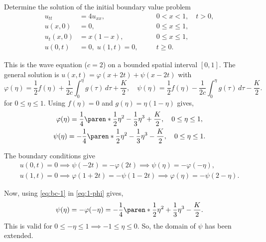 \documentclass[11pt]{penrose}
\begin{document}
\clearpage
\begin{problem}{6}
    Determine the solution of the initial boundary value problem
    \begin{equation*}
        \begin{aligned}
            u_{tt} &= 4u_{xx}, & &0 < x < 1, \quad t > 0,\\
            u(x,0) &= 0, & &0 \leq x \leq 1,\\
            u_t(x,0) &= x(1-x), & &0 \leq x \leq 1,\\
            u(0,t) &= 0, \; u(1,t) = 0, & \quad &t \geq 0.
        \end{aligned}
    \end{equation*}
    
    \solution This is the wave equation ($c = 2$) on a bounded spatial interval $[0,1]$. The general solution is $u(x, t) = \varphi(x + 2t) + \psi(x - 2t)$ with
    \begin{equation*}
        \varphi(\eta) = \frac{1}{2} f(\eta) + \frac{1}{2c} \int_0^\eta g(\tau) \,d\tau + \frac{K}{2},
        \quad
        \psi(\eta) = \frac{1}{2} f(\eta) - \frac{1}{2c} \int_0^\eta g(\tau) \,d\tau - \frac{K}{2}.
    \end{equation*}
    for $0 \leq \eta \leq 1$. Using $f(\eta) = 0$ and $g(\eta) = \eta (1 - \eta)$ gives,
    \begin{gather}
        \varphi(\eta) = \frac{1}{4} \paren*{\frac{1}{2}\eta^2 - \frac{1}{3}\eta^3} + \frac{K}{2}, \quad 0 \leq \eta \leq 1, \label{eq:1-phi}\\
        \psi(\eta) = - \frac{1}{4} \paren*{\frac{1}{2}\eta^2 - \frac{1}{3}\eta^3} - \frac{K}{2}, \quad 0 \leq \eta \leq 1. \label{eq:1-psi}
    \end{gather}

    The boundary conditions give
    \begin{gather*}
        u(0,t) = 0 \implies \psi(-2t) = -\varphi(2t) \implies \psi(\eta) = -\varphi(-\eta), \tag{\textasteriskcentered} \label{eq:bc-1}\\
        u(1,t) = 0 \implies \varphi(1+2t) = -\psi(1-2t) \implies \varphi(\eta) = -\psi(2-\eta). \tag{\textasteriskcentered\textasteriskcentered} \label{eq:bc-2}
    \end{gather*}

    Now, using \eqref{eq:bc-1} in \eqref{eq:1-phi} gives,
    \begin{equation}
        \psi(\eta)
        = -\varphi(-\eta)
        = -\frac{1}{4} \paren*{\frac{1}{2}\eta^2 + \frac{1}{3}\eta^3} - \frac{K}{2}. \label{eq:2-psi}
    \end{equation}
    This is valid for $0 \leq -\eta \leq 1 \implies -1 \leq \eta \leq 0$. So, the domain of $\psi$ has been extended.


\end{problem}
\end{document}
